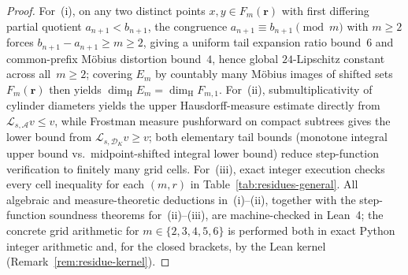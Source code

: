 \documentclass[11pt]{article}
\theoremstyle{definition}
\theoremstyle{remark}
\newcommand{\dimH}{\dim_{\mathrm{H}}}
\begin{document}
\begin{proof}
For~(i), on any two distinct points $x,y\in F_m(\mathbf r)$ with first differing
partial quotient $a_{n+1}<b_{n+1}$, the congruence $a_{n+1}\equiv b_{n+1}\pmod m$
with $m\ge2$ forces $b_{n+1}-a_{n+1}\ge m\ge2$, giving a uniform tail expansion
ratio bound~$6$ and common-prefix Möbius distortion bound~$4$, hence global
$24$-Lipschitz constant across all~$m\ge2$; covering $E_m$ by countably many
Möbius images of shifted sets $F_m(\mathbf r)$ then yields $\dimH E_m=\dimH F_{m,1}$.
For~(ii), submultiplicativity of cylinder diameters yields the upper
Hausdorff-measure estimate directly from $\mathcal L_{s,\mathcal A}v\le v$, while
Frostman measure pushforward on compact subtrees gives the lower bound from
$\mathcal L_{s,\mathcal D_K}v\ge v$; both elementary tail bounds (monotone
integral upper bound vs.\ midpoint-shifted integral lower bound) reduce step-function
verification to finitely many grid cells. For~(iii), exact integer execution
checks every cell inequality for each $(m,r)$ in Table~\ref{tab:residues-general}.
All algebraic and measure-theoretic deductions in~(i)--(ii), together with the
step-function soundness theorems for~(ii)--(iii), are machine-checked in Lean~4;
the concrete grid arithmetic for $m\in\{2,3,4,5,6\}$ is performed both in exact
Python integer arithmetic and, for the closed brackets, by the Lean kernel
(Remark~\ref{rem:residue-kernel}).
\end{proof}
\end{document}
